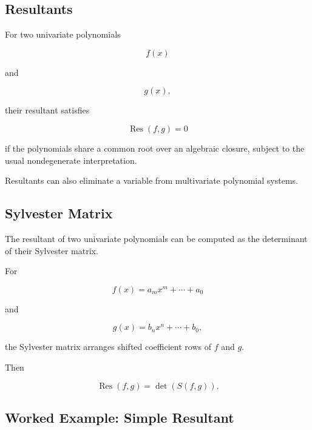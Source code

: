 \subsection{Resultants}
\label{subsec:computer-algebra-resultants}

For two univariate polynomials

\[
f(x)
\]

and

\[
g(x),
\]

their resultant satisfies

\[
\boxed{
\operatorname{Res}(f,g)=0
}
\]

if the polynomials share a common root over an algebraic closure, subject
to the usual nondegenerate interpretation.

Resultants can also eliminate a variable from multivariate polynomial
systems.

\subsection{Sylvester Matrix}
\label{subsec:sylvester-matrix}

The resultant of two univariate polynomials can be computed as the
determinant of their Sylvester matrix.

For

\[
f(x)
=
a_mx^m+\cdots+a_0
\]

and

\[
g(x)
=
b_nx^n+\cdots+b_0,
\]

the Sylvester matrix arranges shifted coefficient rows of \(f\) and \(g\).

Then

\[
\boxed{
\operatorname{Res}(f,g)
=
\det(S(f,g)).
}
\]

\subsection{Worked Example: Simple Resultant}
\label{subsec:worked-resultant}

